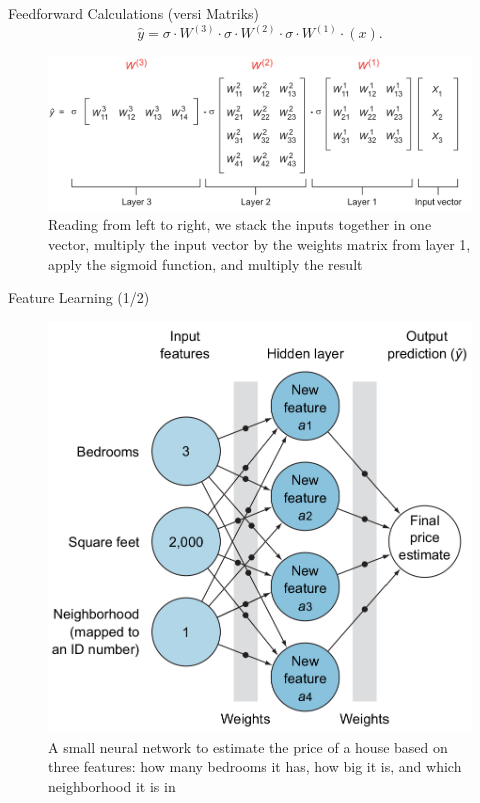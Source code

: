 \documentclass{beamer}
\begin{document}
\begin{frame}{Feedforward Calculations (versi Matriks)}
	\begin{equation*}
		\hat{y} = \sigma \cdot W^{(3)} \cdot \sigma \cdot W^{(2)} \cdot \sigma \cdot W^{(1)} \cdot (x). 
	\end{equation*}
	\begin{figure}[ht]
	\centering
	\includegraphics[scale=0.2]{images/feedforward-matriks}
	\caption{Reading from left to right, we stack the inputs together in one vector, multiply the input vector by the weights matrix from layer 1, apply the sigmoid function, and multiply the result}
\end{figure}							
\end{frame}

\begin{frame}{Feature Learning (1/2)}
	\begin{figure}[ht]
	\centering
	\includegraphics[scale=0.2]{images/small-network}
	\caption{A small neural network to estimate the price of a house based on three features: how many bedrooms it has, how big it is, and which neighborhood it is in}
\end{figure}								
\end{frame}
\end{document}
